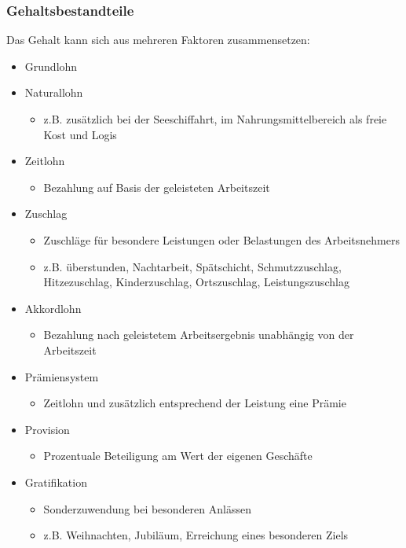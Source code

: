 \subsubsection{Gehaltsbestandteile} 
Das Gehalt kann sich aus mehreren Faktoren zusammensetzen:
\begin{itemize}
\setlength\itemsep{0em}
	\item Grundlohn
	\item Naturallohn
		\begin{itemize}
			\item z.B. zusätzlich bei der Seeschiffahrt, im Nahrungsmittelbereich als \ql freie Kost und Logis\qr\
		\end{itemize}
	\item Zeitlohn
		\begin{itemize}
			\item Bezahlung auf Basis der geleisteten Arbeitszeit
		\end{itemize}
	\item Zuschlag
		\begin{itemize}
			\item Zuschläge für besondere Leistungen oder Belastungen des Arbeitsnehmers
			\item z.B. überstunden, Nachtarbeit, Spätschicht, Schmutzzuschlag, Hitzezuschlag, Kinderzuschlag, Ortszuschlag, Leistungszuschlag
		\end{itemize}
	\item Akkordlohn
		\begin{itemize}
			\item Bezahlung nach geleistetem Arbeitsergebnis unabhängig von der Arbeitszeit
		\end{itemize}
	\item Prämiensystem
		\begin{itemize}
			\item Zeitlohn und zusätzlich entsprechend der Leistung eine Prämie
		\end{itemize}
	\item Provision
		\begin{itemize}
			 \item Prozentuale Beteiligung am Wert der eigenen Geschäfte
		\end{itemize}
	\item Gratifikation
		\begin{itemize}
			\item Sonderzuwendung bei besonderen Anlässen
			\item z.B. Weihnachten, Jubiläum, Erreichung eines besonderen Ziels

\end{itemize}
\end{itemize}
